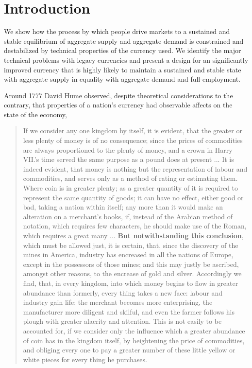 \chapter{Introduction}

We show how the process by which people drive markets to a sustained and stable equilibrium of
aggregate supply and aggregate demand is constrained and destabilized by technical properties of the
currency used. We identify the major technical problems with legacy currencies and present a design
for an significantly improved currency that is highly likely to maintain a sustained and stable
state with aggregate supply in equality with aggregate demand and full-employment.

Around 1777 David Hume observed, despite theoretical considerations to the contrary, that properties of
a nation's currency had observable affects on the state of the economy,

\begin{quotation}
If we consider any one kingdom by itself, it is evident, that the greater or less plenty of money is
    of no consequence; since the prices of commodities are always proportioned to the plenty of
    money, and a crown in Harry VII.’s time served the same purpose as a pound does at present ...
    It is indeed evident, that money is nothing but the representation of labour and commodities,
    and serves only as a method of rating or estimating them. Where coin is in greater plenty; as a
    greater quantity of it is required to represent the same quantity of goods; it can have no
    effect, either good or bad, taking a nation within itself; any more than it would make an
    alteration on a merchant’s books, if, instead of the Arabian method of notation, which requires
    few characters, he should make use of the Roman, which requires a great many ... \textbf{But notwithstanding this conclusion}, which must be allowed just, it is certain, that, since the
    discovery of the mines in America, industry has encreased in all the nations of Europe, except
    in the possessors of those mines; and this may justly be ascribed, amongst other reasons, to the
    encrease of gold and silver.  Accordingly we find, that, in every kingdom, into which money
    begins to flow in greater abundance than formerly, every thing takes a new face: labour and
    industry gain life; the merchant becomes more enterprising, the manufacturer more diligent and
    skilful, and even the farmer follows his plough with greater alacrity and attention. This is not
    easily to be accounted for, if we consider only the influence which a greater abundance of coin
    has in the kingdom itself, by heightening the price of commodities, and obliging every one to
    pay a greater number of these little yellow or white pieces for every thing he purchases.
\end{quotation}

